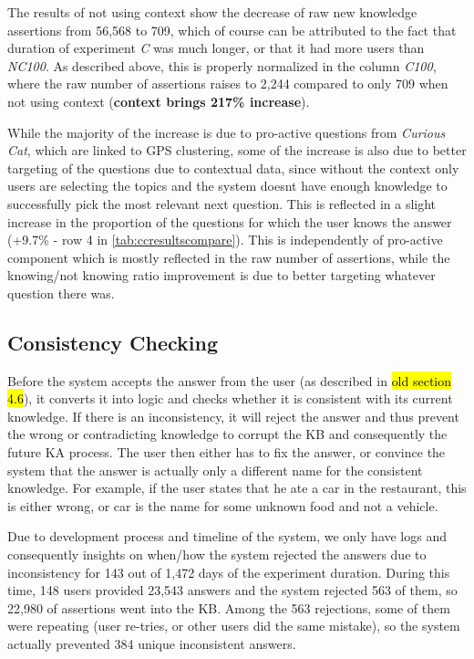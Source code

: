 {The results of not using context show the decrease of raw new knowledge 
assertions from 56,568 to 709, which of course can be attributed to the fact 
that duration of experiment \emph{C} was much longer, or that it had more users
than \emph{NC100}. As described above, this is properly normalized in the 
column \emph{C100}, where the raw number of assertions raises to 2,244 
compared to only 709 when not using context (\textbf{context brings 217\% 
increase}).

While the majority of the increase is due to pro-active questions from 
\emph{Curious Cat}, which are linked to GPS clustering, some of the increase 
is also due to better targeting of the questions due to contextual data, 
since without the context only users are selecting the topics and the system 
doesnt have enough knowledge to successfully pick the most relevant next 
question. This is reflected in a slight increase in the proportion of the 
questions for which the user knows the answer (+9.7\% - row 4 in 
\autoref{tab:ccresultscompare}). This is independently of pro-active component 
which is mostly reflected in the raw number of assertions, while the 
knowing/not knowing ratio improvement is due to better targeting whatever 
question there was.

\subsection{Consistency Checking}
\label{section:resultsConsistencyChecking}
Before the system accepts the answer from the user (as described in 
\hl{old section 4.6}), it converts it into logic and checks whether it is 
consistent with its current knowledge. If there is an inconsistency, it will 
reject the answer and thus prevent the wrong or contradicting knowledge to 
corrupt the KB and consequently the future KA process. The user then either has
to fix the answer, or convince the system that the answer is actually only a 
different name for the consistent knowledge. For example, if the user states 
that he ate a car in the restaurant, this is either wrong, or car is the name 
for some unknown food and not a vehicle.

Due to development process and timeline of the system, we only have logs and 
consequently insights on when/how the system rejected the answers due to 
inconsistency for 143 out of 1,472 days of the experiment duration. During 
this time, 148 users provided 23,543 answers and the system rejected 563 of 
them, so 22,980 of assertions went into the KB. Among the 563 rejections, 
some of them were repeating (user re-tries, or other users did the same 
mistake), so the system actually prevented 384 unique inconsistent answers.

}

